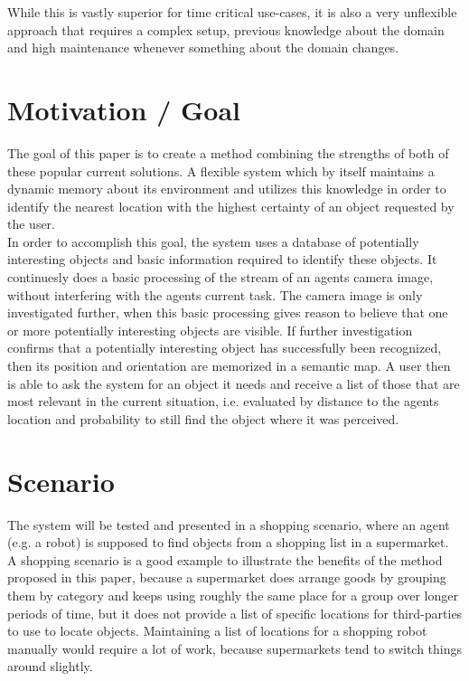 \documentclass[11pt, twoside, a4paper]{report}
\begin{document}
While this is vastly superior for time critical use-cases, it is also a very unflexible approach that requires a complex setup, previous knowledge about the domain and high maintenance whenever something about the domain changes.

\section{Motivation / Goal} %
The goal of this paper is to create a method combining the strengths of both of these popular current solutions. A flexible system which by itself maintains a dynamic memory about its environment and utilizes this knowledge in order to identify the nearest location with the highest certainty of an object requested by the user. \\

In order to accomplish this goal, the system uses a database of potentially interesting objects and basic information required to identify these objects. It continuesly does a basic processing of the stream of an agents camera image, without interfering with the agents current task. The camera image is only investigated further, when this basic processing gives reason to believe that one or more potentially interesting objects are visible. If further investigation confirms that a potentially interesting object has successfully been recognized, then its position and orientation are memorized in a semantic map. A user then is able to ask the system for an object it needs and receive a list of those that are most relevant in the current situation, i.e. evaluated by distance to the agents location and probability to still find the object where it was perceived.

\section{Scenario}
The system will be tested and presented in a shopping scenario, where an agent (e.g. a robot) is supposed to find objects from a shopping list in a supermarket. \\

A shopping scenario is a good example to illustrate the benefits of the method proposed in this paper, because a supermarket does arrange goods by grouping them by category and keeps using roughly the same place for a group over longer periods of time, but it does not provide a list of specific locations for third-parties to use to locate objects. Maintaining a list of locations for a shopping robot manually would require a lot of work, because supermarkets tend to switch things around slightly. \\
\end{document}
